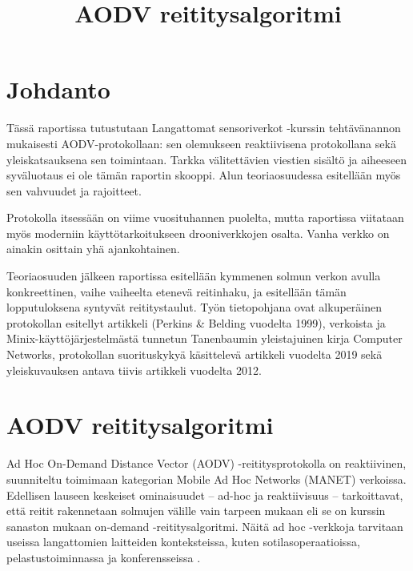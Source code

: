\documentclass[finnish,utf8,nonumbib,palatino]{KokkolaRaportti}
\title{AODV reititysalgoritmi}
\begin{document}
\mainmatter

\chapter{Johdanto}

Tässä raportissa tutustutaan Langattomat sensoriverkot -kurssin tehtävänannon mukaisesti AODV-protokollaan: sen olemukseen reaktiivisena protokollana sekä yleiskatsauksena sen toimintaan. Tarkka välitettävien viestien sisältö ja aiheeseen syväluotaus ei ole tämän raportin skooppi. Alun teoriaosuudessa esitellään myös sen vahvuudet ja rajoitteet.

Protokolla itsessään on viime vuosituhannen puolelta, mutta raportissa viitataan myös moderniin käyttötarkoitukseen drooniverkkojen osalta. Vanha verkko on ainakin osittain yhä ajankohtainen.

Teoriaosuuden jälkeen raportissa esitellään kymmenen solmun verkon avulla konkreettinen, vaihe vaiheelta etenevä reitinhaku, ja esitellään tämän lopputuloksena syntyvät reititystaulut. Työn tietopohjana ovat alkuperäinen protokollan esitellyt artikkeli (Perkins & Belding vuodelta 1999), verkoista ja Minix-käyttöjärjestelmästä tunnetun Tanenbaumin yleistajuinen kirja Computer Networks, protokollan suorituskykyä käsittelevä artikkeli vuodelta 2019 sekä yleiskuvauksen antava tiivis artikkeli vuodelta 2012.






\chapter{AODV reititysalgoritmi}

Ad Hoc On-Demand Distance Vector (AODV) -reititysprotokolla on reaktiivinen, suunniteltu toimimaan kategorian Mobile Ad Hoc Networks (MANET) verkoissa. Edellisen lauseen keskeiset ominaisuudet -- ad-hoc ja reaktiivisuus -- tarkoittavat, että reitit rakennetaan solmujen välille vain tarpeen mukaan \cite{charles-1999} eli se on kurssin sanaston mukaan on-demand -reititysalgoritmi. Näitä ad hoc -verkkoja tarvitaan useissa langattomien laitteiden konteksteissa, kuten sotilasoperaatioissa, pelastustoiminnassa ja konferensseissa \cite{kumar-2019}.
\end{document}
